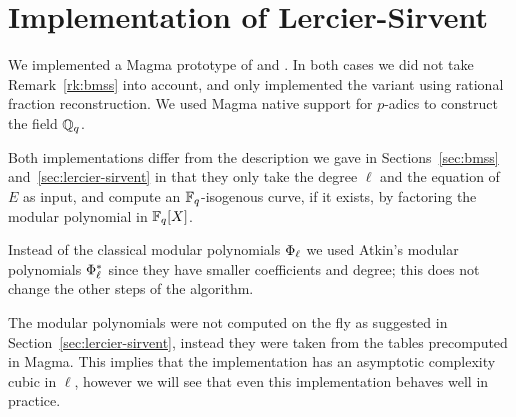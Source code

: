 \section{Implementation of Lercier-Sirvent}
We implemented a Magma prototype of \hyperref[alg:bmss]{}
and \hyperref[alg:le-si]{}. In both cases we did
not take Remark~\ref{rk:bmss} into account, and only implemented the
variant using rational fraction reconstruction. We used Magma native
support for $p$-adics to construct the field $\mathbb{Q}_q$.

Both implementations differ from the description we gave in
Sections~\ref{sec:bmss} and~\ref{sec:lercier-sirvent} in that they
only take the degree $\ell$ and the equation of $E$ as input, and
compute an $\mathbb{F}_q$-isogenous curve, if it exists, by factoring the
modular polynomial in $\mathbb{F}_q[X]$.

Instead of the classical modular polynomials $\Phi_\ell$ we used
Atkin's modular polynomials $\Phi^\ast_\ell$ since they have
smaller coefficients and degree; this does not change the other steps
of the algorithm.

The modular polynomials were not computed on the fly as suggested in
Section~\ref{sec:lercier-sirvent}, instead they were taken from the
tables precomputed in Magma. This implies that the implementation has
an asymptotic complexity cubic in $\ell$, however we will see that
even this implementation behaves well in practice.


%
